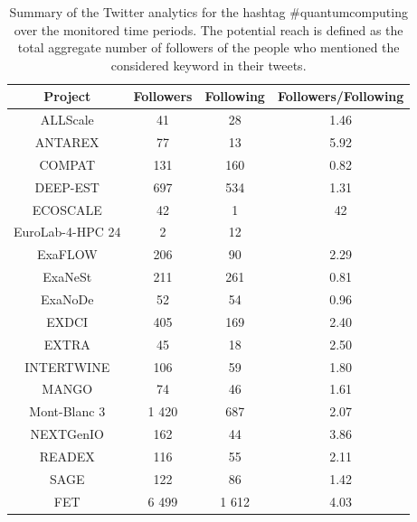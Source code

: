 \begin{table}[t]
 \begin{center}
 {\scriptsize
  \begin{tabular}{cccc}
   \hline 
   \hline
   Project & Followers & Following & Followers/Following \\ 
   \hline
   \hline
   ALLScale & 41 & 28 & 1.46 \\
   ANTAREX & 77 & 13 & 5.92 \\
   COMPAT & 131 & 160 & 0.82 \\
   DEEP-EST & 697 & 534 & 1.31 \\
   ECOSCALE & 42 & 1 & 42 \\
   EuroLab-4-HPC 24 & 2 & 12 \\
   ExaFLOW & 206 & 90 & 2.29 \\
   ExaNeSt & 211 & 261 & 0.81  \\
   ExaNoDe & 52 & 54 & 0.96 \\
   EXDCI & 405 & 169 & 2.40 \\
   EXTRA & 45 & 18 & 2.50\\
   INTERTWINE & 106 & 59 & 1.80 \\
   MANGO & 74 & 46 & 1.61 \\
   Mont-Blanc 3 & 1 420 & 687 & 2.07 \\
   NEXTGenIO & 162 & 44 & 3.86 \\
   READEX & 116 & 55 & 2.11 \\
   SAGE & 122 & 86 & 1.42 \\ 
   FET & 6 499 & 1 612 & 4.03 \\
   \hline
   \hline
  \end{tabular}
 } 
 \end{center} 
 \caption{Summary of the Twitter analytics for the hashtag \#quantumcomputing over the monitored time periods. The potential reach is defined as the total aggregate number of followers of the people who mentioned the considered keyword in their tweets.}
\label{HPC_influence_table} 
\end{table}

